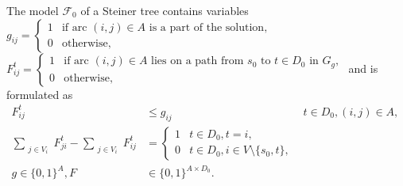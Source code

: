 The model $\mathcal{F}_0$ of a Steiner tree contains variables
%
\newline\newline
  $g_{ij}=
\begin{cases}
    1 & \text{if arc $(i,j) \in A$ is a part of the solution},\\
    0 & \text{otherwise},
\end{cases}$
\newline\newline
  $F^{t}_{ij}=
\begin{cases}
    1 & \text{if arc $(i,j) \in A$ lies on a path from $s_0$ to $t\in D_0$ in $G_g$},\\
    0 & \text{otherwise},
\end{cases}$
\newline\newline
%
and is formulated as
\begin{subequations}
\begin{align}
\label{con:pf1:xfrel} F^{t}_{ij} & \leq g_{ij} & t\in D_0, (i,j)\in A, \\
\label{con:pf1:flow} \sum\limits_{\substack{ j \in V_i }}F^{t}_{ji}-\sum\limits_{\substack{j\in V_i}}F^{t}_{ij} &= 
  \begin{cases}
    1 & t\in D_0, t = i,\\
    0 & t\in D_0, i\in V\setminus \{s_0, t\},
  \end{cases}\\
\label{con:pf1:dim}g \in \{0,1\}^{A},F&\in\{0,1\}^{A \times D_0}.
\end{align}~
\end{subequations}

